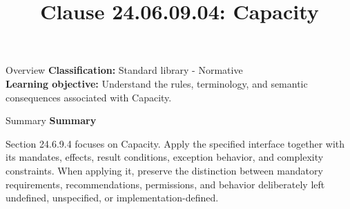 \documentclass[10pt,letterpaper]{article}
\title{Clause 24.06.09.04: Capacity}
\author{}
\date{}
\begin{document}
\maketitle
\begin{CornellOverviewBox}{Overview}
\textbf{Classification:} Standard library - Normative\\[2pt]
\textbf{Learning objective:} Understand the rules, terminology, and semantic consequences associated with Capacity.
\end{CornellOverviewBox}\begin{CornellSummaryBox}{Summary}
{\sffamily\bfseries\color{Accent} Summary}\par\vspace{3pt}Section 24.6.9.4 focuses on Capacity. Apply the specified interface together with its mandates, effects, result conditions, exception behavior, and complexity constraints. When applying it, preserve the distinction between mandatory requirements, recommendations, permissions, and behavior deliberately left undefined, unspecified, or implementation-defined.
\end{CornellSummaryBox}
\end{document}
